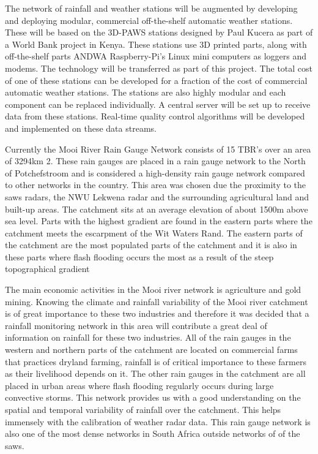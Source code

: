 \documentclass{wrcreport}
\begin{document}
The network of rainfall and weather stations will be augmented by
developing and deploying modular, commercial off-the-shelf automatic
weather stations. These will be based on the 3D-PAWS stations designed
by Paul Kucera as part of a World Bank project in Kenya. These
stations use 3D printed parts, along with off-the-shelf parts ANDWA
Raspberry-Pi's Linux mini computers as loggers and modems. The
technology will be transferred as part of this project. The total cost
of one of these stations can be developed for a fraction of the cost
of commercial automatic weather stations. The stations are also highly
modular and each component can be replaced individually. A central
server will be set up to receive data from these stations. Real-time
quality control algorithms will be developed and implemented on these
data streams.

Currently the Mooi River Rain Gauge Network consists of 15 TBR’s over
an area of 3294km 2. These rain gauges are placed in a rain gauge
network to the North of Potchefstroom and is considered a high-density
rain gauge network compared to other networks in the country. This
area was chosen due the proximity to the \gls{saws} radars, the NWU
Lekwena radar and the surrounding agricultural land and built-up
areas.  The catchment sits at an average elevation of about 1500m
above sea level. Parts with the highest gradient are found in the
eastern parts where the catchment meets the escarpment of the Wit
Waters Rand. The eastern parts of the catchment are the most populated
parts of the catchment and it is also in these parts where flash
flooding occurs the most as a result of the steep topographical
gradient

The main economic activities in the Mooi river network is agriculture
and gold mining. Knowing the climate and rainfall variability of the
Mooi river catchment is of great importance to these two industries
and therefore it was decided that a rainfall monitoring network in
this area will contribute a great deal of information on rainfall for
these two industries. All of the rain gauges in the western and
northern parts of the catchment are located on commercial farms that
practices dryland farming, rainfall is of critical importance to these
farmers as their livelihood depends on it. The other rain gauges in
the catchment are all placed in urban areas where flash flooding
regularly occurs during large convective storms.  This network
provides us with a good understanding on the spatial and temporal
variability of rainfall over the catchment. This helps immensely with
the calibration of weather radar data. This rain gauge network is also
one of the most dense networks in South Africa outside networks of of
the \gls{saws}.
\end{document}
